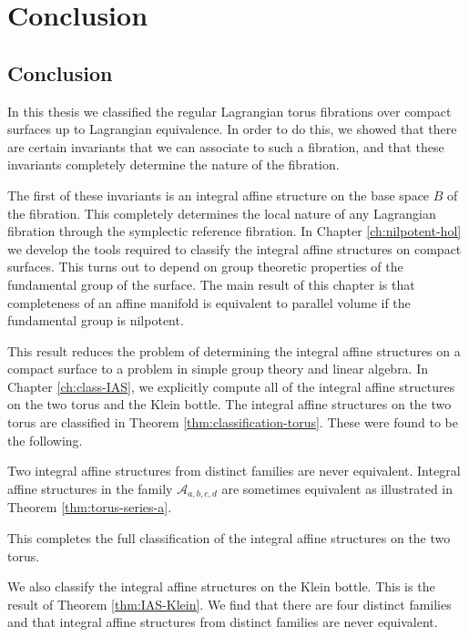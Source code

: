 \chapter*{Conclusion}
\label{ch:conclusion}
\section*{Conclusion}

In this thesis we classified the regular Lagrangian torus fibrations over
compact surfaces up to Lagrangian equivalence. In order to do this, we showed
that there are certain invariants that we can associate to such a fibration,
and that these invariants completely determine the nature of the fibration.

The first of these invariants is an integral affine structure on the base space
$B$ of the fibration. This completely determines the local nature of any
Lagrangian fibration through the symplectic reference fibration. In Chapter
\ref{ch:nilpotent-hol} we develop the tools required to classify the integral
affine structures on compact surfaces. This turns out to depend on group
theoretic properties of the fundamental group of the surface. The main result
of this chapter is that completeness of an affine manifold is equivalent to
parallel volume if the fundamental group is nilpotent.

This result reduces the problem of determining the integral affine structures
on a compact surface to a problem in simple group theory and linear algebra. In
Chapter \ref{ch:class-IAS}, we explicitly compute all of the integral affine
structures on the two torus and the Klein bottle. The integral affine
structures on the two torus are classified in Theorem
\ref{thm:classification-torus}. These were found to be the following.

\classificationtorus*

Two integral affine structures from distinct families are never equivalent.
Integral affine structures in the family $\mathcal{A}_{a,b,c,d}$ are sometimes
equivalent as illustrated in Theorem \ref{thm:torus-series-a}.

\torusA*
This completes the full classification of the integral affine structures on the two torus.

We also classify the integral affine structures on the Klein bottle. This is
the result of Theorem \ref{thm:IAS-Klein}. We find that there are four distinct
families and that integral affine structures from distinct families are never
equivalent.

